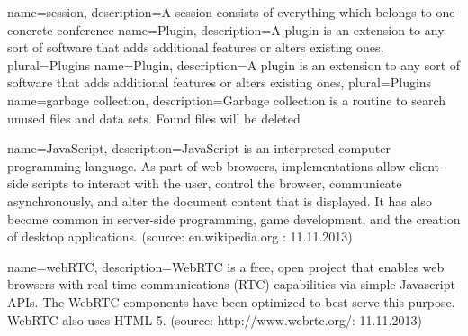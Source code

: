 {
	name=session,
	description={A session consists of everything which belongs to one concrete conference}
}
{
	name=Plugin,
	description={A plugin is an extension to any sort of software that adds additional features or alters existing ones},
	plural=Plugins
}
{
	name=Plugin,
	description={A plugin is an extension to any sort of software that adds additional features or alters existing ones},
	plural=Plugins
}
{
name=garbage collection,
description={Garbage collection is a routine to search unused files and data sets. Found files will be deleted}
}



{
name=JavaScript,
description={JavaScript is an interpreted computer programming language. As part of web browsers, implementations allow client-side scripts to interact with the user, control the browser, communicate asynchronously, and alter the document content that is displayed. It has also become common in server-side programming, game development, and the creation of desktop applications. (source: en.wikipedia.org : 11.11.2013)}
}

{
name=webRTC,
description={WebRTC is a free, open project that enables web browsers with real-time communications (RTC) capabilities via simple Javascript APIs. The WebRTC components have been optimized to best serve this purpose. WebRTC also uses HTML 5. (source: http://www.webrtc.org/: 11.11.2013)}
}


